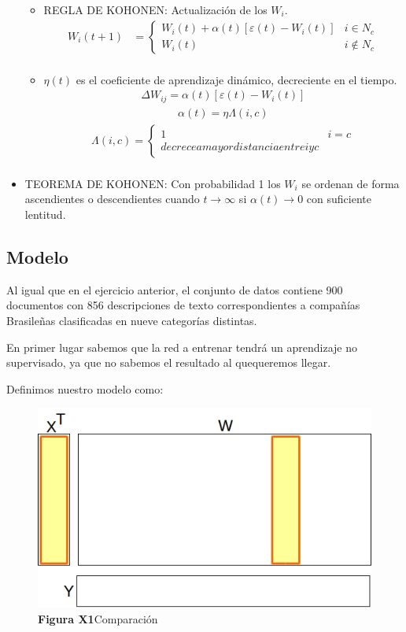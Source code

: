 \begin{itemize}
\begin{itemize}
			\item REGLA DE KOHONEN: Actualización de los $W_{i}$.
					\begin{align*}
					 W_{i}(t+1) &=  \begin{cases}
										W_{i}(t) + \alpha(t) [ \varepsilon(t) - W_{i}(t) ] & i \in N_{c} \\
										W_{i}(t)                                           & i \not \in N_{c}  
									\end{cases} \\
					\end{align*}
			\item $\eta(t)$ es el coeficiente de aprendizaje dinámico, decreciente en el tiempo.
				\begin{align*}
					\Delta W_{ij} = \alpha(t) [ \varepsilon(t) - W_{i}(t) ]
				\end{align*}
				\begin{align*}
					\alpha(t) = \eta \Lambda(i,c)
				\end{align*}
				\begin{align*}
					\Lambda(i,c) = \begin{cases}
										1 & i = c \\
										decrece a mayor distancia entre i y c 
									\end{cases} \\
				\end{align*}
		\end{itemize}
	\item TEOREMA DE KOHONEN: Con probabilidad 1 los $W_{i}$ se ordenan de forma ascendientes o descendientes cuando $t \to
		\infty$ si $\alpha(t) \to 0$ con suficiente lentitud.
\end{itemize}

\subsection{Modelo}
Al igual que en el ejercicio anterior, el conjunto de datos contiene 900 documentos con 856 descripciones de texto correspondientes a compañías Brasileñas clasificadas en nueve categorías distintas.

En primer lugar sabemos que la red a entrenar tendrá un aprendizaje no supervisado, ya que no sabemos el resultado al quequeremos llegar.

Definimos nuestro modelo como:

\begin{figure}[ht!]
	\centering
	\includegraphics[width=0.7\linewidth]{img/parte2-comparacion.jpg}
	\caption{\textbf{Figura X1}Comparación}
\end{figure}

